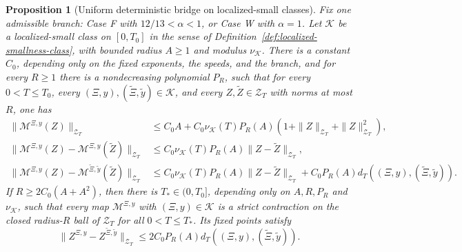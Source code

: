 \documentclass[10pt]{amsart}
\numberwithin{equation}{section}
\theoremstyle{plain}
\newtheorem{proposition}[theorem]{Proposition}
\theoremstyle{definition}
\theoremstyle{remark}
\newcommand{\calZ}{\mathcal{Z}}
\begin{document}
\begin{proposition}[Uniform deterministic bridge on localized-small classes]\label{prop:uniform-deterministic-bridge}
Fix one admissible branch: Case F with $12/13<\alpha<1$, or Case W with $\alpha=1$.  Let $\mathcal K$ be a localized-small class on $[0,T_0]$ in the sense of Definition~\ref{def:localized-smallness-class}, with bounded radius $A\ge1$ and modulus $\nu_{\mathcal K}$.  There is a constant $C_0$, depending only on the fixed exponents, the speeds, and the branch, and for every $R\ge1$ there is a nondecreasing polynomial $P_R$, such that for every $0<T\le T_0$, every $(\Xi,y),(\widetilde\Xi,\widetilde y)\in\mathcal K$, and every $Z,\widetilde Z\in\calZ_T$ with norms at most $R$, one has
\begin{align}
        \|\mathcal M^{\Xi,y}(Z)\|_{\calZ_T}
        &\le C_0 A+C_0\nu_{\mathcal K}(T)P_R(A)(1+\|Z\|_{\calZ_T}+\|Z\|_{\calZ_T}^2),\label{eq:uniform-bridge-map}\\
        \|\mathcal M^{\Xi,y}(Z)-\mathcal M^{\Xi,y}(\widetilde Z)\|_{\calZ_T}
        &\le C_0\nu_{\mathcal K}(T)P_R(A)\|Z-\widetilde Z\|_{\calZ_T},\label{eq:uniform-bridge-contract}\\
        \|\mathcal M^{\Xi,y}(Z)-\mathcal M^{\widetilde\Xi,\widetilde y}(\widetilde Z)\|_{\calZ_T}
        &\le C_0\nu_{\mathcal K}(T)P_R(A)\|Z-\widetilde Z\|_{\calZ_T}
           +C_0 P_R(A)d_T((\Xi,y),(\widetilde\Xi,\widetilde y)).\label{eq:uniform-bridge-two-data}
\end{align}
If $R\ge2C_0(A+A^2)$, then there is $T_*\in(0,T_0]$, depending only on $A,R,P_R$ and $\nu_{\mathcal K}$, such that every map $\mathcal M^{\Xi,y}$ with $(\Xi,y)\in\mathcal K$ is a strict contraction on the closed radius-$R$ ball of $\calZ_T$ for all $0<T\le T_*$.  Its fixed points satisfy
\begin{equation}\label{eq:uniform-bridge-fixedpoint-lipschitz}
        \|Z^{\Xi,y}-Z^{\widetilde\Xi,\widetilde y}\|_{\calZ_T}
        \le 2C_0 P_R(A)d_T((\Xi,y),(\widetilde\Xi,\widetilde y)).
\end{equation}
\end{proposition}
\end{document}
